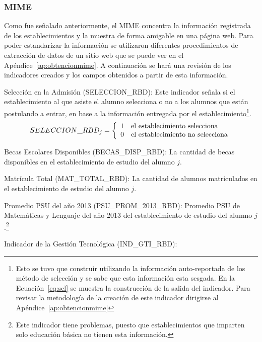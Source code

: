 \subsubsection{MIME}
Como fue señalado anteriormente, el MIME concentra la información registrada de los establecimientos y la muestra de forma amigable en una página web. Para poder estandarizar la información se utilizaron diferentes procedimientos de extracción de datos de un sitio web que se puede ver en el Apéndice~\ref{ap:obtencionmime}.
A continuación se hará una revisión de los indicadores creados y los campos obtenidos a partir de esta información.
\begin{longdescription}
     \item[Selección en la Admisión](SELECCION\_RBD): Este indicador señala si el establecimiento al que asiste el alumno selecciona o no a los alumnos que están postulando a entrar, en base a la información entregada por el establecimiento\footnote{Esto se tuvo que construir utilizando la información auto-reportada de los método de selección y se sabe que esta información esta sesgada. En la Ecuación~\ref{eq:sel} se muestra la construcción de la salida del indicador. Para revisar la metodología de la creación de este indicador dirigirse al Apéndice~\ref{ap:obtencionmime}}.
              \begin{equation}
              \centering
              SELECCION\_RBD_{j} = \left\{
                \begin{array}{c l}
                 1 & \mbox{el establecimiento selecciona}\\
                 0 & \mbox{el establecimiento no selecciona}
                \end{array}
                \right.
                \label{eq:sel}
              \end{equation}
     \item[Becas Escolares Disponibles](BECAS\_DISP\_RBD): La cantidad de becas disponibles en el establecimiento de estudio del alumno $j$.
     \item[Matrícula Total](MAT\_TOTAL\_RBD): La cantidad de alumnos matriculados en el establecimiento de estudio del alumno $j$.
     \item[Promedio PSU del año 2013](PSU\_PROM\_2013\_RBD):
     Promedio PSU de Matemáticas y Lenguaje del año 2013 del establecimiento de estudio del alumno $j$.\footnote{Este indicador tiene problemas, puesto que establecimientos que imparten solo educación básica no tienen esta información.}
     \item[Indicador de la Gestión Tecnológica](IND\_GTI\_RBD):

\end{longdescription}
